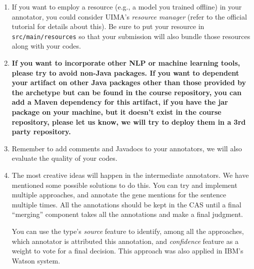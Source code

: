\begin{enumerate}

\item If you want to employ a resource (e.g., a model you trained offline) in
your annotator, you could consider UIMA's \emph{resource manager} (refer to the
official tutorial for details about this).
Be sure to put your resource in \texttt{src/main/resources} so that your
submission will also bundle those resources along with your codes.

\item \textbf{If you want to incorporate other NLP or machine learning tools,
please try to avoid non-Java packages. If you want to dependent your artifact on
other Java packages other than those provided by the archetype but can be found
in the course repository, you can add a Maven dependency for this artifact, if
you have the jar package on your machine, but it doesn't exist in the course
repository, please let us know, we will try to deploy them in a 3rd party
repository.}

\item Remember to add comments and Javadocs to your annotators, we will also
evaluate the quality of your codes.

\item The most creative ideas will happen in the intermediate annotators. We
have mentioned some possible solutions to do this. You can try and implement
multiple approaches, and annotate the gene mentions for the sentence multiple
times. All the annotations should be kept in the CAS until a final ``merging''
component takes all the annotations and make a final judgment.

You can use the type's \emph{source} feature to identify, among all the
approaches, which annotator is attributed this annotation, and \emph{confidence}
feature as a weight to vote for a final decision. This approach was also applied
in IBM's Watson system.

\end{enumerate}
